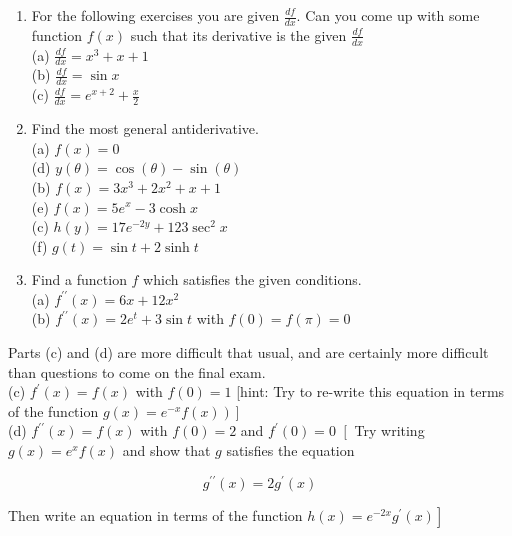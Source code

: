\documentclass[10pt]{article}
\begin{document}
\begin{enumerate}
  \item For the following exercises you are given $\frac{d f}{d x}$. Can you come up with some function $f(x)$ such that its derivative is the given $\frac{d f}{d x}$\\
(a) $\frac{d f}{d x}=x^{3}+x+1$\\
(b) $\frac{d f}{d x}=\sin x$\\
(c) $\frac{d f}{d x}=e^{x+2}+\frac{x}{2}$
  \item Find the most general antiderivative.\\
(a) $f(x)=0$\\
(d) $y(\theta)=\cos (\theta)-\sin (\theta)$\\
(b) $f(x)=3 x^{3}+2 x^{2}+x+1$\\
(e) $f(x)=5 e^{x}-3 \cosh x$\\
(c) $h(y)=17 e^{-2 y}+123 \sec ^{2} x$\\
(f) $g(t)=\sin t+2 \sinh t$
  \item Find a function $f$ which satisfies the given conditions.\\
(a) $f^{\prime \prime}(x)=6 x+12 x^{2}$\\
(b) $f^{\prime \prime}(x)=2 e^{t}+3 \sin t$ with $f(0)=f(\pi)=0$
\end{enumerate}

Parts (c) and (d) are more difficult that usual, and are certainly more difficult than questions to come on the final exam.\\
(c) $f^{\prime}(x)=f(x)$ with $f(0)=1$ [hint: Try to re-write this equation in terms of the function $\left.\left.g(x)=e^{-x} f(x)\right)\right]$\\
(d) $f^{\prime \prime}(x)=f(x)$ with $f(0)=2$ and $f^{\prime}(0)=0$ $\left[\right.$ Try writing $g(x)=e^{x} f(x)$ and show that $g$ satisfies the equation

$$
g^{\prime \prime}(x)=2 g^{\prime}(x)
$$

Then write an equation in terms of the function $\left.h(x)=e^{-2 x} g^{\prime}(x)\right]$
\end{document}
